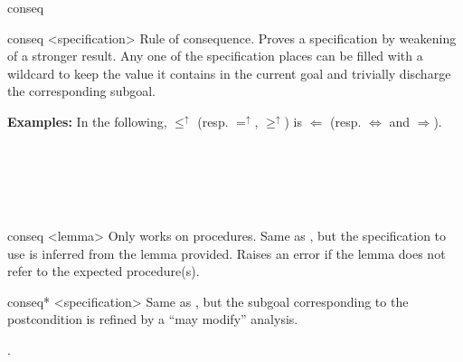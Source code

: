 \begin{tactic}{conseq}
  \begin{tsyntax}{conseq <specification>}
  Rule of consequence. Proves a specification by weakening of a
  stronger result. Any one of the specification places can be filled
  with a wildcard \tct{_} to keep the value it contains in the current
  goal and trivially discharge the corresponding subgoal.

  \textbf{Examples:} In the following, $\leq^\uparrow$ (resp. $=^\uparrow$,
  $\geq^\uparrow$) is $\Leftarrow$ (resp. $\Leftrightarrow$ and
  $\Rightarrow$).
  \begin{mathpar}
    {}%
    \quad{} \\
    {}%
    \quad{} \\
    {}%
    \quad{} \\
    {}%
    \quad{} \\
  \end{mathpar}
  \end{tsyntax}

  \begin{tsyntax}{conseq <lemma>}
  Only works on procedures. Same as , but
  the specification to use is inferred from the lemma provided. Raises
  an error if the lemma does not refer to the expected procedure(s).
  \end{tsyntax}

  \begin{tsyntax}{conseq* <specification>}
  Same as , but the subgoal corresponding
  to the postcondition is refined by a ``may modify'' analysis.
  \end{tsyntax}

  .
\end{tactic}
